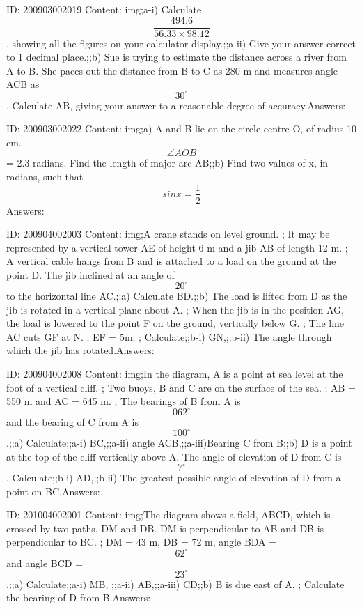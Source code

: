 \documentclass{article}
\begin{document}
ID: 200903002019
Content:
img;a-i) Calculate $$\frac{494.6}{56.33 \times 98.12}$$, showing all the figures on your calculator display.;;a-ii) Give your answer correct to 1 decimal place.;;b) Sue is trying to estimate the distance across a river from A to B. She paces out the distance from B to C as 280 m and measures angle ACB as $$30^{\circ}$$. Calculate AB, giving your answer to a reasonable degree of accuracy.Answers:

ID: 200903002022
Content:
img;a) A and B lie on the circle centre O, of radius 10 cm. $$\angle AOB$$ = 2.3 radians. Find the length of major arc AB;;b) Find two values of x, in radians, such that $$sin x = \frac{1}{2}$$Answers:

ID: 200904002003
Content:
img;A crane stands on level ground. ; It may be represented by a vertical tower AE of height 6 m and a jib AB of length 12 m. ; A vertical cable hangs from B and is attached to a load on the ground at the point D. The jib inclined at an angle of $$20^{\circ}$$ to the horizontal line AC.;;a) Calculate BD.;;b) The load is lifted from D as the jib is rotated in a vertical plane about A. ; When the jib is in the position AG, the load is lowered to the point F on the ground, vertically below G. ; The line AC cuts GF at N. ; EF = 5m. ; Calculate;;b-i) GN,;;b-ii) The angle through which the jib has rotated.Answers:

ID: 200904002008
Content:
img;In the diagram, A is a point at sea level at the foot of a vertical cliff. ; Two buoys, B and C are on the surface of the sea. ; AB = 550 m and AC = 645 m. ; The bearings of B from A is $$062^{\circ}$$ and the bearing of C from A is $$100^{\circ}$$.;;a) Calculate;;a-i) BC,;;a-ii) angle ACB,;;a-iii)Bearing C from B;;b) D is a point at the top of the cliff vertically above A. The angle of elevation of D from C is $$7^{\circ}$$. Calculate;;b-i) AD,;;b-ii) The greatest possible angle of elevation of D from a point on BC.Answers:

ID: 201004002001
Content:
img;The diagram shows a field, ABCD, which is crossed by two paths, DM and DB. DM is perpendicular to AB and DB is perpendicular to BC. ; DM = 43 m, DB = 72 m, angle BDA = $$62^{\circ}$$ and angle BCD = $$23^{\circ}$$.;;a) Calculate;;a-i) MB, ;;a-ii) AB,;;a-iii) CD;;b) B is due east of A. ; Calculate the bearing of D from B.Answers:
\end{document}
